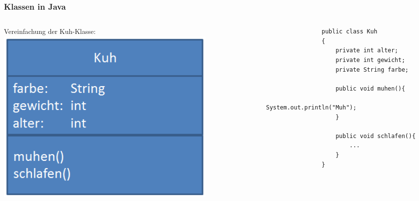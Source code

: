 \begin{frame}[fragile]
	\frametitle{Klassen in Java}
	\begin{columns}
		\begin{column}{0.5\textwidth}
			\small
			Vereinfachung der Kuh-Klasse:
			\center
			\includegraphics[width=0.8\textwidth,
			keepaspectratio=true]{bilder/klasse_ohne_kuh.png}
		\end{column}
		\begin{column}{0.5\textwidth}
			\begin{lstlisting}
				public class Kuh
				{
					private int alter;
					private int gewicht;
					private String farbe;
					
					public void muhen(){
						System.out.println("Muh");
					}
					
					public void schlafen(){
						...
					}
				} 
			\end{lstlisting}
		\end{column}
	\end{columns}
\end{frame}

